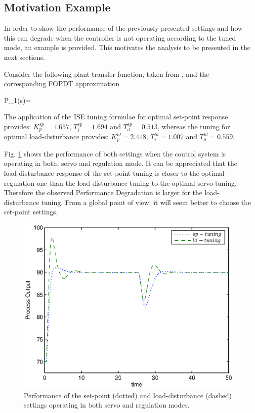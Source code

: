 \subsection{Motivation Example}
\label{motiv_ex}

In order to show the performance of the previously presented
settings and how this can degrade when the controller is not
operating according to the tuned mode, an example is provided.
This motivates the analysis to be presented in the next sections.

Consider the following plant transfer function, taken from
\cite{zhuangAthertonIEE1993}, and the corresponding FOPDT
approximation

\be P_1(s)= \approx
{} \label{system_example} \ee

The application of the ISE tuning formulae for optimal set-point
response provides: $K^{sp}_p=1.657$, $T^{sp}_i=1.694$ and
$T^{sp}_d=0.513$, whereas the tuning for optimal load-disturbance
provides: $K^{ld}_p=2.418$, $T^{ld}_i=1.007$ and $T^{ld}_d=0.559$.

Fig. \ref{example1} shows the performance of both settings when
the control system is operating in both, servo and regulation
mode. It can be appreciated that the load-disturbance response of
the set-point tuning is closer to the optimal regulation one than
the load-disturbance tuning to the optimal servo tuning. Therefore
the observed Performance Degradation is larger for the
load-disturbance tuning. From a global point of view, it will seem
better to choose the set-point settings.

\begin{figure}[h!]
    \begin{center}
        \includegraphics[width=0.8\linewidth]{ex0.eps}
        \caption{Performance of the set-point (dotted) and load-disturbance (dashed)
        settings operating in both servo and regulation modes.}
        \label{example1}
    \end{center}
\end{figure}
